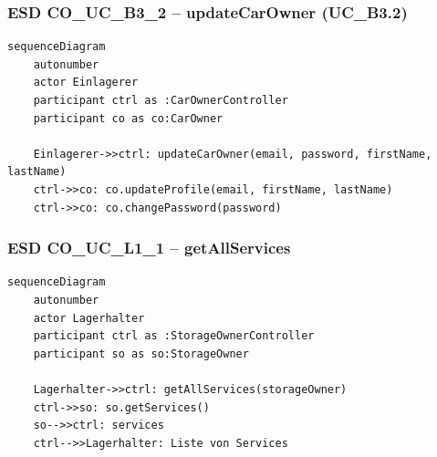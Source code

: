 \newpage

{}
\subsubsection*{ESD CO\_UC\_B3\_2 – updateCarOwner (UC\_B3.2)}

\begin{lstlisting}[basicstyle=\ttfamily\small, breaklines=true]
sequenceDiagram
    autonumber
    actor Einlagerer
    participant ctrl as :CarOwnerController
    participant co as co:CarOwner

    Einlagerer->>ctrl: updateCarOwner(email, password, firstName, lastName)
    ctrl->>co: co.updateProfile(email, firstName, lastName)
    ctrl->>co: co.changePassword(password)
\end{lstlisting}

\newpage

{}
\subsubsection*{ESD CO\_UC\_L1\_1 – getAllServices}

\begin{lstlisting}[basicstyle=\ttfamily\small, breaklines=true]
sequenceDiagram
    autonumber
    actor Lagerhalter
    participant ctrl as :StorageOwnerController
    participant so as so:StorageOwner

    Lagerhalter->>ctrl: getAllServices(storageOwner)
    ctrl->>so: so.getServices()
    so-->>ctrl: services
    ctrl-->>Lagerhalter: Liste von Services
\end{lstlisting}

\newpage

{}
